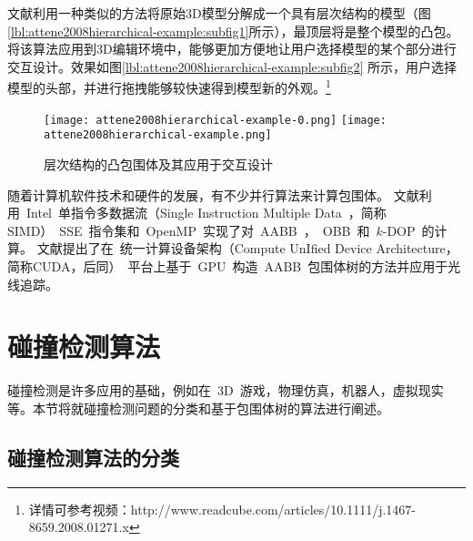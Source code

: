 文献\cite{attene2008hierarchical}利用一种类似的方法将原始3D模型分解成一个具有层次结构的模型（图\ref{lbl:attene2008hierarchical-example:subfig1}所示），最顶层将是整个模型的凸包。将该算法应用到3D编辑环境中，能够更加方便地让用户选择模型的某个部分进行交互设计。效果如图\ref{lbl:attene2008hierarchical-example:subfig2} 所示，用户选择模型的头部，并进行拖拽能够较快速得到模型新的外观。\footnote{详情可参考视频：http://www.readcube.com/articles/10.1111/j.1467-8659.2008.01271.x }

\begin{figure}[htbp]
  \centering
    {\texttt{[image: attene2008hierarchical-example-0.png]}}
    {\texttt{[image: attene2008hierarchical-example.png]}}
  \caption{层次结构的凸包围体及其应用于交互设计\cite{attene2008hierarchical}}
  \label{lbl:attene2008hierarchical-example}
\end{figure}

随着计算机软件技术和硬件的发展，有不少并行算法来计算包围体。
文献\cite{karlsson2010parallel}利用~Intel~单指令多数据流（Single Instruction
Multiple Data~，简称SIMD）~SSE~指令集和~OpenMP~实现了对~AABB~，~OBB~和~$k$-DOP~的计算。
文献\cite{lauterbach2009fast}提出了在~统一计算设备架构（Compute UnIfied Device
Architecture，简称CUDA，后同）~平台上基于~GPU~构造~AABB~包围体树的方法并应用于光线追踪。

\section{碰撞检测算法}
\label{sec:collisiondetection}

碰撞检测是许多应用的基础，例如在~3D~游戏，物理仿真，机器人，虚拟现实等。本节将就碰撞检测问题的分类和基于包围体树的算法进行阐述。

\subsection{碰撞检测算法的分类}
\label{sec:cd-category}

